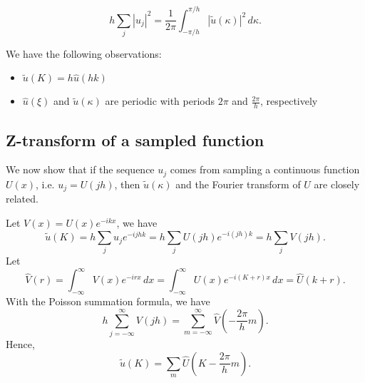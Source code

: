 \begin{proposition}
\label{prop: Parsevals identity II}
\[
    h \sum_j |u_j|^2 = \frac{1}{2\pi}\int_{-\pi /h}^{\pi /h}  |\tilde u (\kappa)|^2\, d\kappa. 
\]
\end{proposition}

We have the following observations: 
\begin{itemize}
    \item $ \tilde u(K) = h\hat u (hk) $ 
    \item $ \hat u (\xi)  $ and $\tilde u(\kappa)$ are periodic with periods $2\pi$ and $\frac{2\pi}{h}$, respectively 
\end{itemize}

\subsection{Z-transform of a sampled function}
We now show that if the sequence $u_j$ comes from sampling a continuous function $U(x)$, i.e. $u_j = U(jh)$, then $\tilde u(\kappa)$ and the Fourier transform of $U$ are closely related.  

Let $V(x) = U(x) e^{-ikx}$, we have 
\[
    \tilde u(K) = h \sum_j u_j e^{-{ijhk}} = h \sum_j U(jh) e^{-i(jh)k} = h \sum_j V(jh). 
\]
Let 
\[
    \hat V(r) = \int_{-\infty}^{\infty} V(x) e^{-irx} \, dx = \int_{-\infty}^\infty U(x) e^{-i(K+r)x} \, dx = \hat U(k+r).  
\]
With the Poisson summation formula, we have 
\[
    h \sum_{j=-\infty}^{\infty} V(jh) = \sum_{m=-\infty}^{\infty} \hat V\left( -\frac{2\pi }{h}m \right).   
\]
Hence, 
\[
    \tilde u(K) = \sum_{m} \hat U\left( K - \frac{2\pi }{h}m \right) . 
\]